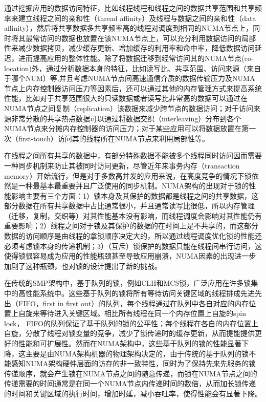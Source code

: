 通过挖掘应用的数据访问特征，比如线程线程和线程之间的数据共享范围和共享频率来建立线程之间的亲和性（thread affinity）及线程与数据之间的亲和性（data affinity）\cite{diener2014kmaf}\cite{azimi2009enhancing}\cite{tikir2008hardware}，然后将共享数据多共享频率高的线程对调度到相同的NUMA节点上，同时将其最常访问的数据也放置在该NUMA节点上，可以充分利用数据访问的局部性来减少数据拷贝，减少缓存更新、增加缓存的利用率和命中率，降低数据访问延迟，进而提高应用的整体性能\cite{chishti2005optimizing}。除了将数据迁移到经常访问其的NUMA节点(co-location)外，通过分析数据本身的特征，比如读写比、共享范围、访问来源（来自于哪个NUM）等,并且考虑NUMA节点间高速通信介质的数据传输压力及NUMA节点上内存控制器访问压力等因素后，还可以通过其他的内存管理方式来提高系统性能\cite{dashti2013traffic}\cite{molka2011memory}，比如对于共享范围很大的只读数据或者读写比非常高的数据可以通过在NUMA节点之间复制（replication）该数据来减少跨节点的数据访问；对于访问来源非常分散的共享热点数据可以通过将数据交织（interleaving）分布到各个NUMA节点来分摊内存控制器的访问压力；对于某些应用可以将数据放置在第一次（first-touch）访问其的线程所在NUMA节点来利用局部性等。

在线程之间所有共享的数据中，有部分特殊数据不能被多个线程同时访问因而需要一种同步机制来防止其被同时访问更新，尽管近年来事务内存（transaction memory）开始流行，但是对于多数高并发的应用来说，在高度竞争的情况下锁依然是一种最基本最重要并且广泛使用的同步机制\cite{tallent2010analyzing}\cite{johnson2010decoupling}。NUMA架构的出现对于锁的性能影响主要有三个方面：1）锁本身及其保护的数据都是线程之间的共享数据，这部分数据在所有共享数据中占比通常很小，并且通常读写比很低，所以内存管理（迁移，复制，交织等）对其性能基本没有影响，而线程调度会影响对其性能仍有重要影响；2）线程之间对于锁及其保护的数据的在时间上是不共享的，而这部分数据的访问顺序是由线程的拿锁顺序决定大的，所以通过线程调度优化锁的性能还必须考虑锁本身的传递机制；3）（互斥）锁保护的数据只能在线程间串行访问，这使得锁很容易成为应用的性能瓶颈甚至导致应用崩溃\cite{boyd2012non}，NUMA因素的出现进一步加剧了这种瓶颈，也对锁的设计提出了新的挑战。

在传统的SMP架构中，基于队列的锁，例如CLH\cite{craig1993building}\cite{magnusson1994queue}\cite{scott2013shared}和MCS锁\cite{mellor1991algorithms}\cite{scott2013shared}，广泛应用在许多锁集中的高性能系统中\cite{dice2011flat}。这些基于队列的锁将所有等待访问关键区域的线程排成先进先出（FIFO，first in first out）的队列，每个线程通过在队列中各自对应的内存位置上自旋来等待进入关键区域。相比所有线程在同一个内存位置上自旋的spin lock， FIFO的队列保证了基于队列的锁的公平性；每个线程在各自的内存位置上自旋，分散了线程对锁变量的竞争，减少了锁传递时的缓存更新，从而提能提供更好的性能和可扩展性。然而在NUMA架构中，这些基于队列的锁的性能显著下降，这主要是由NUMA架构机器的物理架构决定的，由于传统的基于队列的锁不能感知NUMA架构硬件层面的访存的非一致特性，同时为了保持先来先服务的锁传递顺序，就会产生锁在NUMA节点之间的随意传递，而锁在NUMA节点之间的传递需要的时间通常是在同一个NUMA节点内传递时间的数倍，从而加长锁传递的时间和关键区域的执行时间，增加时延，减小吞吐率，使得性能会有显著下降。

